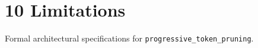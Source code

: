 \section{10 Limitations}

Formal architectural specifications for \texttt{progressive_token_pruning}.
